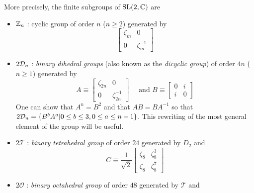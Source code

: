             More precisely, the finite subgroups of $\text{SL}(2,\mathbb{C})$ are
            \begin{itemize}
                \item $\mathbb{Z}_n$ : cyclic group of order $n$ ($n\geq2$) generated by
                \begin{equation}
                    \begin{bmatrix}
                        \zeta_m & 0\\
                        0 & \zeta^{-1}_m
                    \end{bmatrix}
                \end{equation}
                \item $2\mathcal{D}_n$ : \emph{binary dihedral groups} (also known as the \emph{dicyclic group}) of order $4n$ ($n\geq1$) generated by
                \begin{equation}
                    A \equiv
                    \begin{bmatrix}
                        \zeta_{2n} & 0\\
                        0 & \zeta^{-1}_{2n}
                    \end{bmatrix}\quad \text{ and }
                    B \equiv 
                    \begin{bmatrix}
                        0 & i\\
                        i & 0
                    \end{bmatrix}
                \end{equation}
                One can show that $A^n=B^2$ and that $AB=BA^{-1}$ so that $2\mathcal{D}_n=\{B^bA^a|0\leq b \leq 3, 0\leq a \leq n-1\}$. This rewriting of the most general element of the group will be useful.
                \item $2\mathcal{T}$ : \emph{binary tetrahedral group} of order $24$ generated by $D_2$ and
                \begin{equation}
                    C \equiv \frac{1}{\sqrt{2}}
                    \begin{bmatrix}
                        \zeta_8 & \zeta^3_8\\
                        \zeta_8 & \zeta^7_8
                    \end{bmatrix}
                \end{equation}
                \item $2\mathcal{O}$ : \emph{binary octahedral group} of order $48$ generated by $\mathcal{T}$ and
                \begin{equation}

\end{equation}
\end{itemize}
